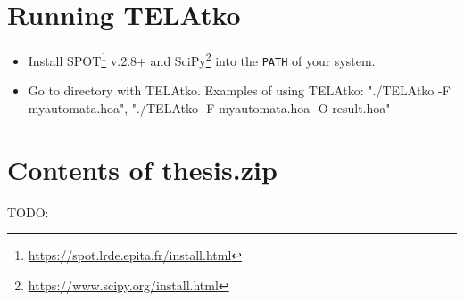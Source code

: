 \documentclass[
  digital, %
  twoside, %
  table,   %
  lof,     %
  lot,     %
]{fithesis3}
\begin{document}
\section{Running TELAtko}
\begin{itemize}
  \item Install SPOT\footnote{\url{https://spot.lrde.epita.fr/install.html}} v.2.8+ and SciPy\footnote{\url{https://www.scipy.org/install.html}} into the \texttt{PATH} of your system.
  \item Go to directory with TELAtko. Examples of using TELAtko: "./TELAtko -F myautomata.hoa", "./TELAtko -F myautomata.hoa -O result.hoa"
\end{itemize}
\section{Contents of thesis.zip}
TODO:
\end{document}
